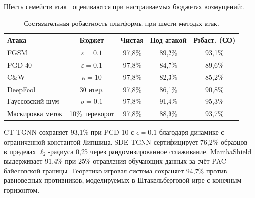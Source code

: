 


\label{sec:adversarial_eval}%

Шесть семейств атак~\cite{Goodfellow2015,Madry2018,Carlini2017,Croce2020} оцениваются при настраиваемых бюджетах возмущений:.

\begin{table}[htbp]\centering\small
\caption{Состязательная робастность платформы при шести методах атак.}
\label{tab:adversarial}
\renewcommand{\arraystretch}{0.92}\begin{tabular}{lcccc}
\toprule
Атака & Бюджет & Чистая & Под атакой & Робаст. (СО) \\
\midrule
FGSM             & $\varepsilon{=}0.1$ & 97,8\% & 89,2\% & 93,1\% \\
PGD-40           & $\varepsilon{=}0.1$ & 97,8\% & 84,7\% & 89,6\% \\
C\&W             & $\kappa{=}10$       & 97,8\% & 82,3\% & 85,2\% \\
DeepFool         & 30 итер.            & 97,8\% & 86,1\% & 90,8\% \\
Гауссовский шум  & $\sigma{=}0.1$      & 97,8\% & 91,4\% & 95,3\% \\
Маскировка меток & 10\% переворот      & 97,8\% & 88,9\% & 93,7\% \\
\bottomrule
\end{tabular}\end{table}

CT-TGNN сохраняет 93,1\% при PGD-10 с $\epsilon=0.1$ благодаря динамике с ограниченной константой Липшица. SDE-TGNN сертифицирует 76,2\% образцов в пределах $\ell_2$-радиуса 0,25 через рандомизированное сглаживание. MambaShield выдерживает 91,4\% при 25\% отравления обучающих данных за счёт PAC-байесовской границы. Теоретико-игровая система сохраняет 94,7\% против равновесных противников, моделируемых в Штакельберговой игре с конечным горизонтом.

